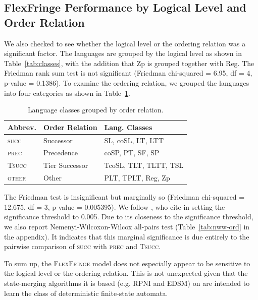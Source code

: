 \documentclass[twoside,11pt]{article}
\newcommand{\tbf}[1]{\textbf{#1}}
\begin{document}
\subsection{FlexFringe Performance by Logical Level and Order Relation} \label{sec:res-relation}

We also checked to see whether the logical level or the ordering
relation was a significant factor. The languages are grouped by the
logical level as shown in Table~\ref{tab:classes}, with the addition
that Zp is grouped together with Reg. The Friedman rank sum test is
not significant (Friedman chi-squared = 6.95, df = 4, p-value = 0.1386).
To examine the ordering relation, we grouped the languages into four
categories as shown in Table~\ref{tab:order-relation}.
\begin{table}[t]
  \centering
  \begin{tabular}{lll}
    \toprule
    \tbf{Abbrev.}  & \tbf{Order Relation} & \tbf{Lang. Classes}   \\
    \midrule
    \textsc{succ}  & Successor            & SL, coSL, LT, LTT     \\
    \textsc{prec}  & Precedence           & coSP, PT, SF, SP      \\
    \textsc{Tsucc} & Tier Successor       & TcoSL, TLT, TLTT, TSL \\
    \textsc{other} & Other                & PLT, TPLT, Reg, Zp    \\
    \bottomrule
  \end{tabular}
  \caption{Language classes grouped by order relation.}
  \label{tab:order-relation}
\end{table}

The Friedman test is insignificant but marginally so (Friedman
chi-squared = 12.675, df = 3, p-value = 0.005395). We follow
\citet{mlregtest}, who cite \citet{Benjamin2018} in setting the
significance threshold to 0.005. Due to its closeness to the
significance threshold, we also report Nemenyi-Wilcoxon-Wilcox
all-pairs test (Table~\ref{tab:nww-ord} in the appendix). It indicates
that this marginal significance is due entirely to the pairwise
comparison of \textsc{succ} with \textsc{prec} and \textsc{Tsucc}.

To sum up, the \textsc{FlexFringe} model does not especially appear to be
sensitive to the logical level or the ordering relation. This is not
unexpected given that the state-merging algorithms it is based
(e.g. RPNI and EDSM) on are intended to learn the class of
deterministic finite-state automata.
\end{document}
